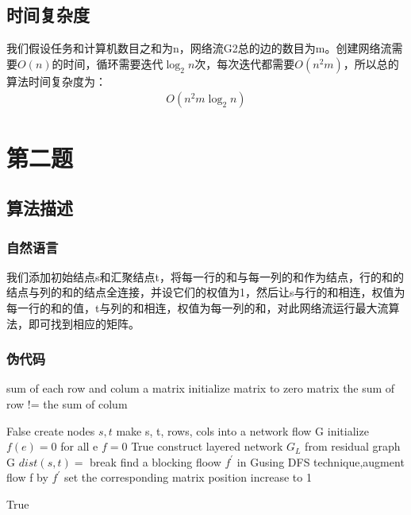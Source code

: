 \documentclass{article}
\begin{document}
		\subsection{时间复杂度}
		我们假设任务和计算机数目之和为n，网络流G2总的边的数目为m。创建网络流需要$O(n)$的时间，循环需要迭代$\log _2 n$次，每次迭代都需要$O(n^{2}m)$，所以总的算法时间复杂度为：
		\begin{equation*}
			\begin{split}
				O(n^{2}m\log_{2}n)
			\end{split}
		\end{equation*}
	\section{第二题}
		\subsection{算法描述}
			\subsubsection{自然语言}
			我们添加初始结点s和汇聚结点t，将每一行的和与每一列的和作为结点，行的和的结点与列的和的结点全连接，并设它们的权值为1，然后让s与行的和相连，权值为每一行的和的值，t与列的和相连，权值为每一列的和，对此网络流运行最大流算法，即可找到相应的矩阵。
			\subsubsection{伪代码}
			\begin{algorithm}
				\begin{algorithmic}[1]
					\Require sum of each row and colum
					\Ensure a matrix
					\State initialize matrix to zero matrix
						\If the sum of row != the sum of colum
							
							\Return False
						\EndIf
						\State create nodes $s,t$
						\State make s, t, rows, cols into a network flow G
						\State initialize $f(e)=0$ for all e
						\State $f=0$
						\While True 
							\State construct layered network $G_L$ from residual graph G
							\If $dist(s,t)=$
								\State break
							\EndIf
							\State find a blocking floow $f^{'}$ in Gusing DFS technique,augment flow f by $f^{'}$
							\State set the corresponding matrix position increase to 1
						\EndWhile
						
						\Return True						
					\EndFunction
				\end{algorithmic}
			\end{algorithm}
\end{document}
